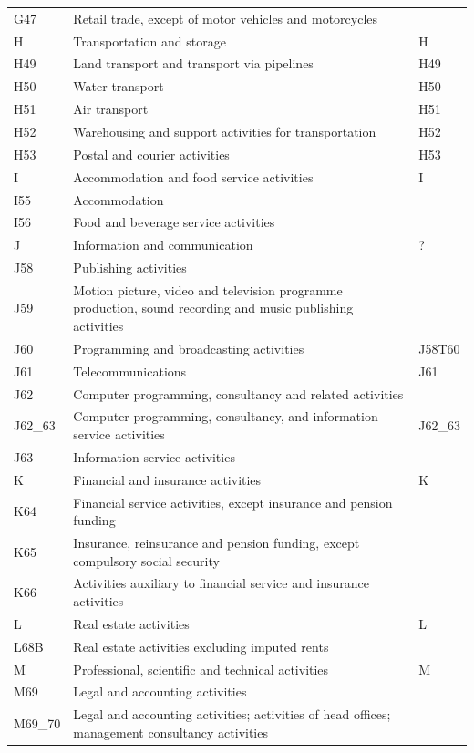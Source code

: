 \documentclass[12pt]{article}
\begin{document}
\begin{tabularx}{\textwidth}{l X l}
G47     & Retail trade, except of motor vehicles and motorcycles &  \\
H       & Transportation and storage & H \\
H49     & Land transport and transport via pipelines & H49 \\
H50     & Water transport & H50 \\
H51     & Air transport & H51 \\
H52     & Warehousing and support activities for transportation & H52 \\
H53     & Postal and courier activities & H53 \\
I       & Accommodation and food service activities & I \\
I55     & Accommodation &  \\
I56     & Food and beverage service activities &  \\
J       & Information and communication & ? \\
J58     & Publishing activities &  \\
J59     & Motion picture, video and television programme production, sound recording and music publishing activities &  \\
J60     & Programming and broadcasting activities & J58T60 \\
J61     & Telecommunications & J61 \\
J62     & Computer programming, consultancy and related activities &  \\
J62\_63 & Computer programming, consultancy, and information service activities & J62\_63 \\
J63     & Information service activities &  \\
K       & Financial and insurance activities & K \\
K64     & Financial service activities, except insurance and pension funding &  \\
K65     & Insurance, reinsurance and pension funding, except compulsory social security &  \\
K66     & Activities auxiliary to financial service and insurance activities &  \\
L       & Real estate activities & L \\
L68B    & Real estate activities excluding imputed rents & \\
M       & Professional, scientific and technical activities & M \\
M69     & Legal and accounting activities &  \\
M69\_70 & Legal and accounting activities; activities of head offices; management consultancy activities &  \\

\end{tabularx}
\end{document}
